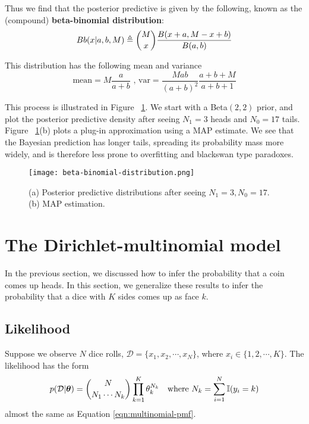 Thus we find that the posterior predictive is given by the following, known as the (compound) \textbf{beta-binomial distribution}:
\begin{equation}
Bb(x|a,b,M) \triangleq \dbinom{M}{x}\dfrac{B(x+a,M-x+b)}{B(a,b)}
\end{equation}

This distribution has the following mean and variance
\begin{equation}
\text{mean}=M\dfrac{a}{a+b} \text{ , var}=\dfrac{Mab}{(a+b)^2}\dfrac{a+b+M}{a+b+1}
\end{equation}

This process is illustrated in Figure ~\ref{fig:beta-binomial-distribution}. We start with a Beta$(2,2)$ prior, and plot the posterior predictive density after seeing $N_1 =3$ heads and $N_0 =17$ tails. Figure ~\ref{fig:beta-binomial-distribution}(b) plots a plug-in approximation using a MAP estimate. We see that the Bayesian prediction has longer tails, spreading its probability mass more widely, and is therefore less prone to overfitting and blackswan type paradoxes.

\begin{figure}[hbtp]
\centering
    \texttt{[image: beta-binomial-distribution.png]}
\caption{(a) Posterior predictive distributions after seeing $N_1=3,N_0=17$. (b) MAP estimation.}
\label{fig:beta-binomial-distribution} 
\end{figure}


\section{The Dirichlet-multinomial model}
In the previous section, we discussed how to infer the probability that a coin comes up heads. In this section, we generalize these results to infer the probability that a dice with $K$ sides comes up as face $k$. 


\subsection{Likelihood}
Suppose we observe $N$ dice rolls, $\mathcal{D}=\{x_1,x_2,\cdots,x_N\}$, where $x_i \in \{1,2,\cdots,K\}$. The likelihood has the form
\begin{equation}
p(\mathcal{D}|\vec{\theta}) = \dbinom{N}{N_1 \cdots N_k} \prod\limits_{k=1}^K\theta_k^{N_k} \quad \text{where } N_k=\sum\limits_{i=1}^N \mathbb{I}(y_i=k)
\end{equation}
almost the same as Equation \eqref{eqn:multinomial-pmf}.


